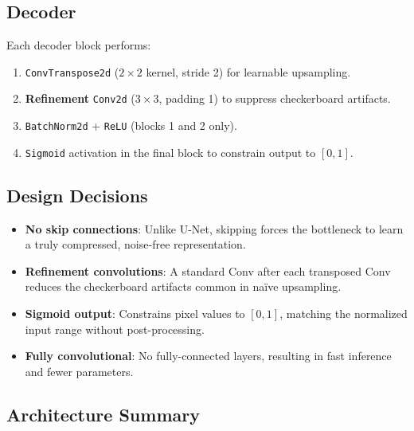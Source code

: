 \documentclass[runningheads]{llncs}
\begin{document}
\subsection{Decoder}
Each decoder block performs:
\begin{enumerate}[nosep]
    \item \texttt{ConvTranspose2d} ($2 \times 2$ kernel, stride 2) for learnable upsampling.
    \item \textbf{Refinement} \texttt{Conv2d} ($3 \times 3$, padding 1) to suppress checkerboard artifacts.
    \item \texttt{BatchNorm2d} + \texttt{ReLU} (blocks 1 and 2 only).
    \item \texttt{Sigmoid} activation in the final block to constrain output to $[0,1]$.
\end{enumerate}

\subsection{Design Decisions}
\begin{itemize}[nosep]
    \item \textbf{No skip connections}: Unlike U-Net, skipping forces the bottleneck to learn a truly compressed, noise-free representation.
    \item \textbf{Refinement convolutions}: A standard Conv after each transposed Conv reduces the checkerboard artifacts common in naïve upsampling.
    \item \textbf{Sigmoid output}: Constrains pixel values to $[0,1]$, matching the normalized input range without post-processing.
    \item \textbf{Fully convolutional}: No fully-connected layers, resulting in fast inference and fewer parameters.
\end{itemize}

\subsection{Architecture Summary}
\end{document}
